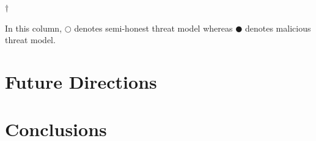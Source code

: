 \documentclass[USenglish,oneside,twocolumn]{article}
\begin{document}
\begin{table}[!t]
{\begin{tabular}{|p{5.7cm}|p{1.0cm}|p{0.7cm}|p{1.4cm}|p{1.1cm}|p{1.4cm}|p{1.1cm}|p{0.7cm}|p{0.8cm}|p{0.6cm}|p{0.8cm}|p{0.6cm}|p{1.1cm}|p{1.5cm}|}
            \hline
        \end{tabular}
    }
    \vspace{0.01cm}
    \newline
    $\dagger$
    \fontsize{7pt}{12pt}\selectfont
    \raggedright In this column, $\Circle$ denotes semi-honest threat model whereas $\CIRCLE$ denotes malicious threat model.
\end{table}

\section{Future Directions}

\section{Conclusions}



\end{document}
